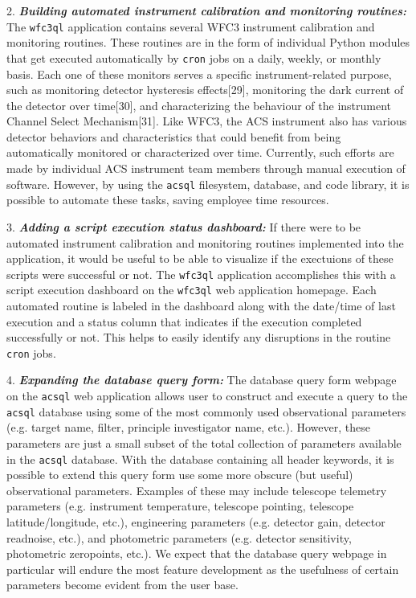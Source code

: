 \documentclass[10pt,journal,compsoc]{IEEEtran}
\begin{document}
2. \textbf{\textit{Building automated instrument calibration and monitoring routines:}}  The \texttt{wfc3ql} application contains several WFC3 instrument calibration and monitoring routines.  These
routines are in the form of individual Python modules that get executed automatically by \texttt{cron} jobs on a daily, weekly, or monthly basis.  Each one of these monitors serves a specific
instrument-related purpose, such as monitoring detector hysteresis effects[29], monitoring the dark current of the detector over time[30], and characterizing the behaviour of the instrument
Channel Select Mechanism[31].  Like WFC3, the ACS instrument also has various detector behaviors and characteristics that could benefit from being automatically monitored or characterized
over time.  Currently, such efforts are made by individual ACS instrument team members through manual execution of software.  However, by using the \texttt{acsql} filesystem, database, and code library,
it is possible to automate these tasks, saving employee time resources.

3. \textbf{\textit{Adding a script execution status dashboard:}}  If there were to be automated instrument calibration and monitoring routines implemented into the application, it would be useful to
be able to visualize if the exectuions of these scripts were successful or not.  The \texttt{wfc3ql} application accomplishes this with a script execution dashboard on the \texttt{wfc3ql} web application
homepage.  Each automated routine is labeled in the dashboard along with the date/time of last execution and a status column that indicates if the execution completed successfully or not.  This helps to
easily identify any disruptions in the routine \texttt{cron} jobs.

4. \textbf{\textit{Expanding the database query form:}}  The database query form webpage on the \texttt{acsql} web application allows user to construct and execute a query to the \texttt{acsql} database
using some of the most commonly used observational parameters (e.g. target name, filter, principle investigator name, etc.).  However, these parameters are just a small subset of the total collection
of parameters available in the \texttt{acsql} database.  With the database containing all header keywords, it is possible to extend this query form use some more obscure (but useful) observational parameters.
Examples of these may include telescope telemetry parameters (e.g. instrument temperature, telescope pointing, telescope latitude/longitude, etc.), engineering parameters (e.g. detector gain, detector
readnoise, etc.), and photometric parameters (e.g. detector sensitivity, photometric zeropoints, etc.).  We expect that the database query webpage in particular will endure the most feature development
as the usefulness of certain parameters become evident from the user base.
\end{document}

